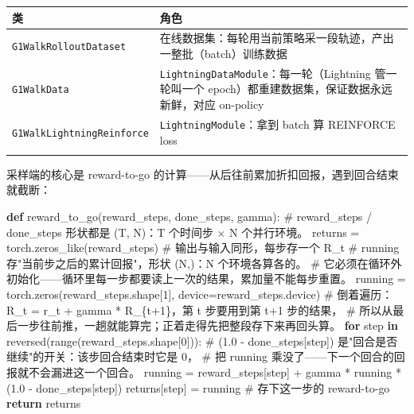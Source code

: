 \documentclass[
  chinese,
]{ctexart}
\newenvironment{Shaded}{\begin{snugshade}}{\end{snugshade}}
\newcommand{\BuiltInTok}[1]{\textcolor[rgb]{0.00,0.23,0.31}{#1}}
\newcommand{\CommentTok}[1]{\textcolor[rgb]{0.37,0.37,0.37}{#1}}
\newcommand{\ControlFlowTok}[1]{\textcolor[rgb]{0.00,0.23,0.31}{\textbf{#1}}}
\newcommand{\DecValTok}[1]{\textcolor[rgb]{0.68,0.00,0.00}{#1}}
\newcommand{\FloatTok}[1]{\textcolor[rgb]{0.68,0.00,0.00}{#1}}
\newcommand{\KeywordTok}[1]{\textcolor[rgb]{0.00,0.23,0.31}{\textbf{#1}}}
\newcommand{\NormalTok}[1]{\textcolor[rgb]{0.00,0.23,0.31}{#1}}
\newcommand{\OperatorTok}[1]{\textcolor[rgb]{0.37,0.37,0.37}{#1}}
\begin{document}
\begin{center}
\begin{tabular}{@{}>{\raggedright\arraybackslash}p{} >{\raggedright\arraybackslash}p{}@{}}
\toprule\noalign{}
类 & 角色 \\
\midrule\noalign{}
\texttt{G1WalkRolloutDataset} & 在线数据集：每轮用当前策略采一段轨迹，产出一整批（batch）训练数据 \\
\texttt{G1WalkData} & \texttt{LightningDataModule}：每一轮（Lightning 管一轮叫一个 epoch）都重建数据集，保证数据永远新鲜，对应 on-policy \\
\texttt{G1WalkLightningReinforce} & \texttt{LightningModule}：拿到 batch 算 REINFORCE loss \\
\bottomrule\noalign{}
\end{tabular}
\end{center}

采样端的核心是 reward-to-go
的计算------从后往前累加折扣回报，遇到回合结束就截断：

\begin{Shaded}
\begin{Highlighting}[]
\KeywordTok{def}\NormalTok{ reward\_to\_go(reward\_steps, done\_steps, gamma):}
    \CommentTok{\# reward\_steps / done\_steps 形状都是 (T, N)：T 个时间步 × N 个并行环境。}
\NormalTok{    returns }\OperatorTok{=}\NormalTok{ torch.zeros\_like(reward\_steps)    }\CommentTok{\# 输出与输入同形，每步存一个 R\_t}
    \CommentTok{\# running 存"当前步之后的累计回报"，形状 (N,)：N 个环境各算各的。}
    \CommentTok{\# 它必须在循环外初始化——循环里每一步都要读上一次的结果，累加量不能每步重置。}
\NormalTok{    running }\OperatorTok{=}\NormalTok{ torch.zeros(reward\_steps.shape[}\DecValTok{1}\NormalTok{], device}\OperatorTok{=}\NormalTok{reward\_steps.device)}
    \CommentTok{\# 倒着遍历：R\_t = r\_t + gamma * R\_\{t+1\}，第 t 步要用到第 t+1 步的结果，}
    \CommentTok{\# 所以从最后一步往前推，一趟就能算完；正着走得先把整段存下来再回头算。}
    \ControlFlowTok{for}\NormalTok{ step }\KeywordTok{in} \BuiltInTok{reversed}\NormalTok{(}\BuiltInTok{range}\NormalTok{(reward\_steps.shape[}\DecValTok{0}\NormalTok{])):}
        \CommentTok{\# (1.0 {-} done\_steps[step]) 是"回合是否继续"的开关：该步回合结束时它是 0，}
        \CommentTok{\# 把 running 乘没了——下一个回合的回报就不会漏进这一个回合。}
\NormalTok{        running }\OperatorTok{=}\NormalTok{ reward\_steps[step] }\OperatorTok{+}\NormalTok{ gamma }\OperatorTok{*}\NormalTok{ running }\OperatorTok{*}\NormalTok{ (}\FloatTok{1.0} \OperatorTok{{-}}\NormalTok{ done\_steps[step])}
\NormalTok{        returns[step] }\OperatorTok{=}\NormalTok{ running    }\CommentTok{\# 存下这一步的 reward{-}to{-}go}
    \ControlFlowTok{return}\NormalTok{ returns}
\end{Highlighting}
\end{Shaded}
\end{document}
